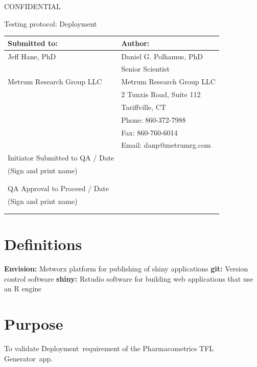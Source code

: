 \documentclass{article}
\newcommand{\tfl}{Pharmacometrics TFL Generator}
\newcommand{\topic}{Deployment}
\begin{document}
\begin{center}
{\large CONFIDENTIAL} 


\vspace*{1cm}


\vspace*{1cm}

{\huge Testing protocol: \topic}
\vspace{3.0cm}

\begin{tabular}{|l|l|}\hline
Submitted to: & Author:\\\hline
Jeff Hane, PhD & Daniel G. Polhamus, PhD \\
&Senior Scientist\\
Metrum Research Group LLC & Metrum Research Group LLC\\
 & 2 Tunxis Road, Suite 112\\
  & Tariffville, CT\\
  & Phone: 860-372-7988 \\
 & Fax: 860-760-6014 \\
  & Email: danp@metrumrg.com \\\hline

  Initiator Submitted to QA  / Date & \\
  
 (Sign and print name) & \\
  & \\
  & \\\hline
  
QA Approval to Proceed / Date & \\

 (Sign and print name) & \\
  & \\
 & \\\hline

\end{tabular}

\end{center}

\newpage
\vspace{3in}
\section*{Definitions}

{\bf Envision:} Metworx platform for publishing of shiny applications
{\bf git:} Version control software
{\bf shiny:} Rstudio software for building web applications that use an R engine


\section*{Purpose}
To validate \topic\ requirement of the \tfl\ app.
\end{document}
